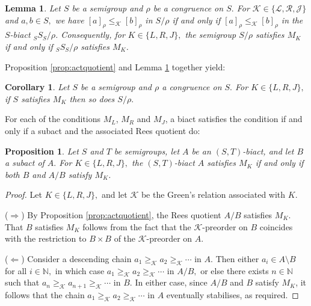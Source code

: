 \documentclass[twoside,a4paper,12pt,reqno]{amsart}
\theoremstyle{plain}
\newtheorem{cor}[thm]{Corollary}
\newtheorem{lem}[thm]{Lemma}
\newtheorem{prop}[thm]{Proposition}
\theoremstyle{definition}
\renewcommand{\l}{\mbox{${\mathcal{L}}$}}
\renewcommand{\r}{\mbox{${\mathcal{R}}$}}
\renewcommand{\j}{\mbox{${\mathcal{J}}$}}
\renewcommand{\k}{\mbox{${\mathcal{K}}$}}
\newcommand{\leqk}{\leq_{\mathcal{K}}}
\newcommand{\geqk}{\geq_{\mathcal{K}}}
\newcommand{\N}{\mathbb{N}}
\newcommand{\sm}{\setminus}
\begin{document}
\begin{lem}\label{lem:quotient}
Let $S$ be a semigroup and $\rho$ be a congruence on $S.$  For $\k\in\{\l,\r,\j\}$ and $a,b\in S,$ we have $[a]_{\rho}\leqk[b]_{\rho}$ in $S/\rho$ if and only if $[a]_{\rho}\leqk[b]_{\rho}$ in the $S$-biact ${_S}S_S/\rho$.  Consequently, for $K\in\{L,R,J\},$ the semigroup $S/\rho$ satisfies $M_K$ if and only if ${_S}S_S/\rho$ satisfies $M_K$.
\end{lem}

Proposition \ref{prop:actquotient} and Lemma \ref{lem:quotient} together yield:

\begin{cor}\label{cor:sgpquotient}
Let $S$ be a semigroup and $\rho$ a congruence on $S.$  For $K\in\{L,R,J\},$ if $S$ satisfies $M_K$ then so does $S/\rho.$
\end{cor}



For each of the conditions $M_L$, $M_R$ and $M_J$, a biact satisfies the condition if and only if a subact and the associated Rees quotient do:

\begin{prop}\label{prop:actex}
Let $S$ and $T$ be semigroups, let $A$ be an $(S,T)$-biact, and let $B$ a subact of $A.$  For $K\in\{L,R,J\},$ the $(S,T)$-biact $A$ satisfies $M_K$ if and only if both $B$ and $A/B$ satisfy $M_K$.
\end{prop}

\begin{proof}
Let $K\in\{L,R,J\},$ and let $\k$ be the Green's relation associated with $K.$

($\Rightarrow$)  By Proposition \ref{prop:actquotient}, the Rees quotient $A/B$ satisfies $M_K$.  That $B$ satisfies $M_K$ follows from the fact that the $\k$-preorder on $B$ coincides with the restriction to $B\times B$ of the $\k$-preorder on $A.$

($\Leftarrow$)  Consider a descending chain $a_1\geqk a_2\geqk\cdots$ in $A.$  Then either $a_i\in A{\sm}B$ for all $i\in\N,$ in which case $a_1\geqk a_2\geqk\cdots$ in $A/B,$ or else there exists $n\in\N$ such that $a_n\geqk a_{n+1}\geqk\cdots$ in $B.$  In either case, since $A/B$ and $B$ satisfy $M_K$, it follows that the chain $a_1\geqk a_2\geqk\cdots$ in $A$ eventually stabilises, as required.
\end{proof}
\end{document}
